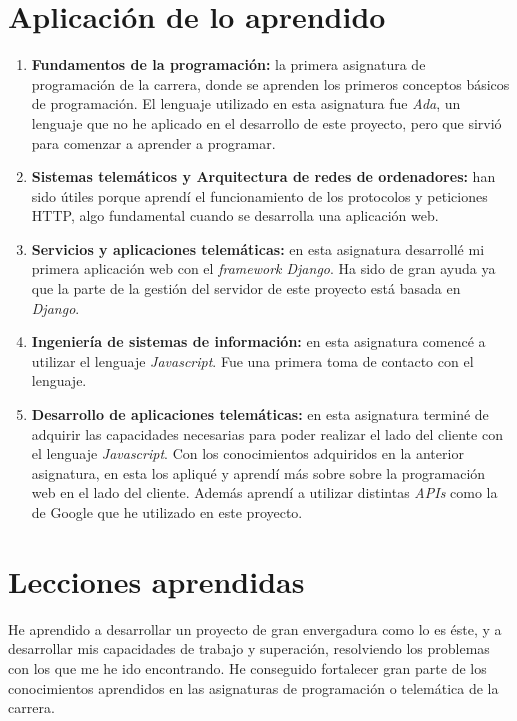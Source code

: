 \documentclass[a4paper, 12pt]{book}
\begin{document}
\section{Aplicación de lo aprendido}
\label{sec:aplicacion}


\begin{enumerate}
  \item \textbf{Fundamentos de la programación:} la primera asignatura de programación de la carrera, donde se aprenden los primeros conceptos básicos de programación. El lenguaje utilizado en esta asignatura fue \textit{Ada}, un lenguaje que no he aplicado en el desarrollo de este proyecto, pero que sirvió para comenzar a aprender a programar.
  \item \textbf{Sistemas telemáticos y Arquitectura de redes de ordenadores:} han sido útiles porque aprendí el funcionamiento de los protocolos y peticiones HTTP, algo fundamental cuando se desarrolla una aplicación web.
  \item \textbf{Servicios y aplicaciones telemáticas:} en esta asignatura desarrollé mi primera aplicación web con el \textit{framework Django}. Ha sido de gran ayuda ya que la parte de la gestión del servidor de este proyecto está basada en \textit{Django}.
  \item \textbf{Ingeniería de sistemas de información:} en esta asignatura comencé a utilizar el lenguaje \textit{Javascript}. Fue una primera toma de contacto con el lenguaje.
  \item \textbf{Desarrollo de aplicaciones telemáticas:} en esta asignatura terminé de adquirir las capacidades necesarias para poder realizar el lado del cliente con el lenguaje \textit{Javascript}. Con los conocimientos adquiridos en la anterior asignatura, en esta los apliqué y aprendí más sobre sobre la programación web en el lado del cliente. Además aprendí a utilizar distintas \textit{APIs} como la de Google que he utilizado en este proyecto.
  
\end{enumerate}


\section{Lecciones aprendidas}
\label{sec:lecciones_aprendidas}

 He aprendido a desarrollar un proyecto de gran envergadura como lo es éste, y a desarrollar mis capacidades de trabajo y superación, resolviendo los problemas con los que me he ido encontrando. He conseguido fortalecer gran parte de los conocimientos aprendidos en las asignaturas de programación o telemática de la carrera.
\newline
\end{document}

